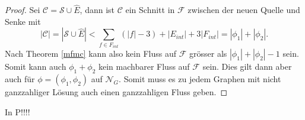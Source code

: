 \begin{proof}
Sei $\mathcal{C} = \mathcal{S} \cup \hat{E}$, dann ist $\mathcal{C}$ ein Schnitt in $\mathcal{F}$ zwischen der neuen Quelle und Senke mit $$|\mathcal{C}| = |\mathcal{S} \cup \hat{E}| < \sum_{f \in F_{int}}{(|f|-3)} +  |E_{int}| + 3|F_{int}|  = |\phi_1| + |\phi_2|.$$ 
Nach Theorem \ref{mfmc} kann also kein Fluss auf $\mathcal{F}$ grösser als $|\phi_1| + |\phi_2| - 1$ sein. Somit kann auch $\phi_1 + \phi_2$ kein machbarer Fluss auf $\mathcal{F}$ sein. Dies gilt dann aber auch für $\phi = (\phi_1,\phi_2)$ auf $\mathcal{N}_G.$ Somit muss es zu jedem Graphen mit nicht ganzzahliger Lösung auch einen ganzzahligen Fluss geben.

\end{proof}

\begin{corollary}

In P!!!!

\end{corollary}
